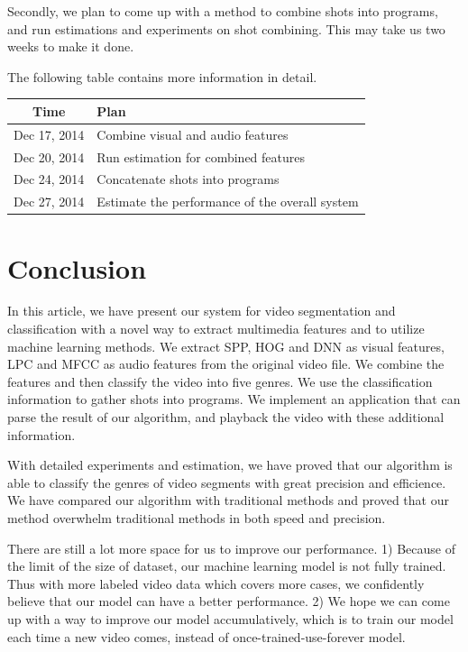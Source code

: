 \documentclass{article}
\begin{document}
Secondly, we plan to come up with a method to combine shots into programs, and run estimations and experiments on shot combining. This may take us two weeks to make it done.

The following table contains more information in detail.

\begin{center}
\begin{tabular}{cp{5cm}}
  \hline
    Time & Plan\\
  \hline
    Dec 17, 2014 & Combine visual and audio features\\
    Dec 20, 2014 & Run estimation for combined features\\
    Dec 24, 2014 & Concatenate shots into programs\\
    Dec 27, 2014 & Estimate the performance of the overall system\\
  \hline
\end{tabular}
\end{center}

\section{Conclusion}

In this article, we have present our system for video segmentation and classification with a novel way to extract multimedia features and to utilize machine learning methods. We extract SPP, HOG and DNN as visual features, LPC and MFCC as audio features from the original video file. We combine the features and then classify the video into five genres. We use the classification information to gather shots into programs. We implement an application that can parse the result of our algorithm, and playback the video with these additional information.

With detailed experiments and estimation, we have proved that our algorithm is able to classify the genres of video segments with great precision and efficience. We have compared our algorithm with traditional methods and proved that our method overwhelm traditional methods in both speed and precision. 

There are still a lot more space for us to improve our performance. 1) Because of the limit of the size of dataset, our machine learning model is not fully trained. Thus with more labeled video data which covers more cases, we confidently believe that our model can have a better performance. 2) We hope we can come up with a way to improve our model accumulatively, which is to train our model each time a new video comes, instead of once-trained-use-forever model.



\end{document}
